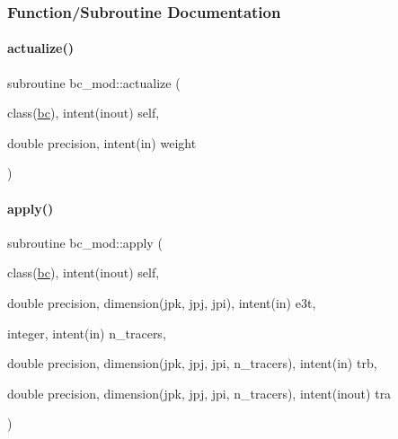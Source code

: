 \subsubsection{Function/\+Subroutine Documentation}
\mbox{\label{namespacebc__mod_abfb3c3416dd78fb3d2ce69a6574dfd41}} 
\paragraph{\texorpdfstring{actualize()}{actualize()}}
{\footnotesize\ttfamily subroutine bc\+\_\+mod\+::actualize (\begin{DoxyParamCaption}\item[{class(\mbox{\hyperlink{structbc__mod_1_1bc}{bc}}), intent(inout)}]{self,  }\item[{double precision, intent(in)}]{weight }\end{DoxyParamCaption})\hspace{0.3cm}{\ttfamily [private]}}

\mbox{\label{namespacebc__mod_afabd5e4d5da39a09c755200972516648}} 
\paragraph{\texorpdfstring{apply()}{apply()}}
{\footnotesize\ttfamily subroutine bc\+\_\+mod\+::apply (\begin{DoxyParamCaption}\item[{class(\mbox{\hyperlink{structbc__mod_1_1bc}{bc}}), intent(inout)}]{self,  }\item[{double precision, dimension(jpk, jpj, jpi), intent(in)}]{e3t,  }\item[{integer, intent(in)}]{n\+\_\+tracers,  }\item[{double precision, dimension(jpk, jpj, jpi, n\+\_\+tracers), intent(in)}]{trb,  }\item[{double precision, dimension(jpk, jpj, jpi, n\+\_\+tracers), intent(inout)}]{tra }\end{DoxyParamCaption})\hspace{0.3cm}{\ttfamily [private]}}

\mbox{\label{namespacebc__mod_ad4804bde248994bc86adf15286b68d7a}} 
